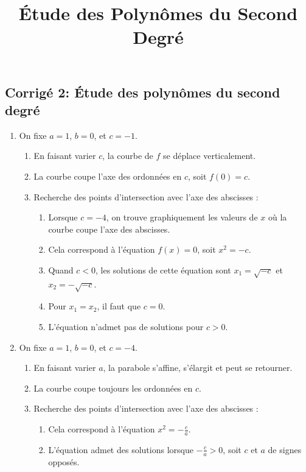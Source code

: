 \documentclass{article}
\title{Étude des Polynômes du Second Degré}
\author{}
\date{}
\begin{document}
\begin{center}
\section*{Corrigé 2: Étude des polynômes du second degré}
\end{center}
\bigskip
\bigskip


\begin{enumerate}
    \item On fixe $a = 1$, $b = 0$, et $c = -1$.
    \begin{enumerate}
        \item En faisant varier $c$, la courbe de $f$ se déplace verticalement.
        \item La courbe coupe l'axe des ordonnées en $c$, soit $f(0) = c$.
        \item Recherche des points d'intersection avec l'axe des abscisses :
        \begin{enumerate}
            \item Lorsque $c = -4$, on trouve graphiquement les valeurs de $x$ où la courbe coupe l'axe des abscisses.
            \item Cela correspond à l'équation $f(x) = 0$, soit $x^2 = -c$.
            \item Quand $c < 0$, les solutions de cette équation sont $x_1 = \sqrt{-c}$ et $x_2 = -\sqrt{-c}$.
            \item Pour $x_1 = x_2$, il faut que $c = 0$.
            \item L'équation n'admet pas de solutions pour $c > 0$.
        \end{enumerate}
    \end{enumerate}

    \item On fixe $a = 1$, $b = 0$, et $c = -4$.
    \begin{enumerate}
        \item En faisant varier $a$, la parabole s'affine, s'élargit et peut se retourner.
        \item La courbe coupe toujours les ordonnées en $c$.
        \item Recherche des points d'intersection avec l'axe des abscisses :
        \begin{enumerate}
            \item Cela correspond à l'équation $x^2 = -\frac{c}{a}$.
            \item L'équation admet des solutions lorsque $-\frac{c}{a} > 0$, soit $c$ et $a$ de signes opposés.
        \end{enumerate}
    \end{enumerate}


\end{enumerate}
\end{document}

